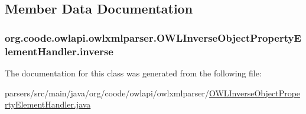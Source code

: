 \subsection{Member Data Documentation}
\hypertarget{classorg_1_1coode_1_1owlapi_1_1owlxmlparser_1_1_o_w_l_inverse_object_property_element_handler_a990e5eff9c46a352c1d2423b506393bd}{
\subsubsection[{inverse}]{ org.\-coode.\-owlapi.\-owlxmlparser.\-O\-W\-L\-Inverse\-Object\-Property\-Element\-Handler.\-inverse\hspace{0.3cm}{\ttfamily [private]}}}\label{classorg_1_1coode_1_1owlapi_1_1owlxmlparser_1_1_o_w_l_inverse_object_property_element_handler_a990e5eff9c46a352c1d2423b506393bd}


The documentation for this class was generated from the following file\-:\begin{DoxyCompactItemize}
\item 
parsers/src/main/java/org/coode/owlapi/owlxmlparser/\hyperlink{_o_w_l_inverse_object_property_element_handler_8java}{O\-W\-L\-Inverse\-Object\-Property\-Element\-Handler.\-java}\end{DoxyCompactItemize}
